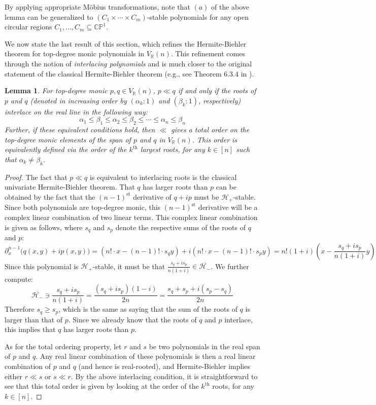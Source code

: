 \documentclass{article}
\newtheorem{lemma}[theorem]{Lemma}
\theoremstyle{definition}
\theoremstyle{plain}
\newcommand{\R}{\mathbb{R}}
\newcommand{\CP}{\mathbb{CP}}
\newcommand{\UHP}{\mathcal{H}_+}
\newcommand{\LHP}{\mathcal{H}_-}
\begin{document}
By applying appropriate M{\"o}bius transformations, note that $(a)$ of the above lemma can be generalized to $(C_1 \times \cdots \times C_m)$-stable polynomials for any open circular regions $C_1,\ldots,C_m \subseteq \CP^1$.

We now state the last result of this section, which refines the Hermite-Biehler theorem for top-degree monic polynomials in $V_\R(n)$. This refinement comes through the notion of \emph{interlacing polynomials} and is much closer to the original statement of the classical Hermite-Biehler theorem (e.g., see Theorem 6.3.4 in \cite{rahman2002anthpoly}).

\begin{lemma}\label{total_order_lemma}
    For top-degree monic $p,q \in V_\R(n)$, $p \ll q$ if and only if the roots of $p$ and $q$ (denoted in increasing order by $(\alpha_k:1)$ and $(\beta_k:1)$, respectively) interlace on the real line in the following way:
    \[
        \alpha_1 \leq \beta_1 \leq \alpha_2 \leq \beta_2 \leq \cdots \leq \alpha_n \leq \beta_n
    \]
    Further, if these equivalent conditions hold, then $\ll$ gives a total order on the top-degree monic elements of the span of $p$ and $q$ in $V_\R(n)$. This order is equivalently defined via the order of the $k^\text{th}$ largest roots, for any $k \in [n]$ such that $\alpha_k \neq \beta_k$.
\end{lemma}
\begin{proof}
    The fact that $p \ll q$ is equivalent to interlacing roots is the classical univariate Hermite-Biehler theorem. That $q$ has larger roots than $p$ can be obtained by the fact that the $(n-1)^\text{st}$ derivative of $q + ip$ must be $\UHP$-stable. Since both polynomials are top-degree monic, this $(n-1)^\text{st}$ derivative will be a complex linear combination of two linear terms. This complex linear combination is given as follows, where $s_q$ and $s_p$ denote the respective sums of the roots of $q$ and $p$:
    \[
        \partial_x^{n-1} \big(q(x,y) + ip(x,y)\big) = (n! \cdot x - (n-1)! \cdot s_q y) + i(n! \cdot x - (n-1)! \cdot s_p y) = n!(1+i)\left(x - \frac{s_q + i s_p}{n(1 + i)} y\right)
    \]
    Since this polynomial is $\UHP$-stable, it must be that $\frac{s_q + i s_p}{n(1 + i)} \in \overline{\LHP}$. We further compute:
    \[
        \overline{\LHP} \ni \frac{s_q + i s_p}{n(1 + i)} = \frac{(s_q + i s_p)(1-i)}{2n} = \frac{s_q + s_p + i(s_p-s_q)}{2n}
    \]
    Therefore $s_q \geq s_p$, which is the same as saying that the sum of the roots of $q$ is larger than that of $p$. Since we already know that the roots of $q$ and $p$ interlace, this implies that $q$ has larger roots than $p$.
    
    As for the total ordering property, let $r$ and $s$ be two polynomials in the real span of $p$ and $q$. Any real linear combination of these polynomials is then a real linear combination of $p$ and $q$ (and hence is real-rooted), and Hermite-Biehler implies either $r \ll s$ or $s \ll r$. By the above interlacing condition, it is straightforward to see that this total order is given by looking at the order of the $k^\text{th}$ roots, for any $k \in [n]$.
\end{proof}
\end{document}
